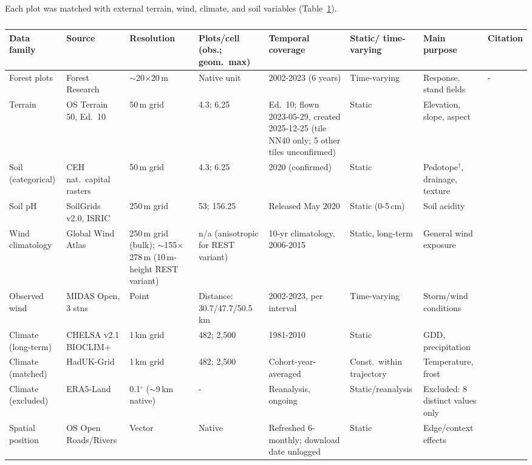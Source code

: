Each plot was matched with external terrain, wind, climate, and soil variables (Table~\ref{tab:data-env-sources}). 

\begin{table}[!htbp]
\tiny
\setlength{\tabcolsep}{2pt}
\renewcommand{\arraystretch}{0.9}
\begin{tabular}{p{1.6cm}p{2.1cm}p{1.6cm}p{1.5cm}p{2.3cm}p{1.6cm}p{2.3cm}p{0.7cm}}
\hline
Data family & Source & Resolution & Plots/cell (obs.; geom.\ max) & Temporal coverage & Static/ time-varying & Main purpose & Citation \\
\hline
Forest plots & Forest Research & $\sim$20$\times$20\,m & Native unit & 2002-2023 (6 years) & Time-varying & Response, stand fields & - \\
Terrain & OS Terrain 50, Ed.\ 10 & 50\,m grid & 4.3; 6.25 & Ed.\ 10; flown 2023-05-29, created 2025-12-25 (tile NN40 only; 5 other tiles unconfirmed) & Static & Elevation, slope, aspect & \cite{ordnancesurveyTerrain50_C3_LID} \\
Soil (categorical) & CEH nat.\ capital rasters & 50\,m grid & 4.3; 6.25 & 2020 (confirmed) & Static & Pedotope$^{\dagger}$, drainage, texture & \cite{feeney2026CEHNaturalCapital_C3_LID} \\
Soil pH & SoilGrids v2.0, ISRIC & 250\,m grid & 53; 156.25 & Released May 2020 & Static (0-5\,cm) & Soil acidity & \cite{poggio2021SoilGrids_C3_LID} \\
Wind climatology & Global Wind Atlas & 250\,m grid (bulk); $\sim$155$\times$278\,m (10\,m-height REST variant) & n/a (anisotropic for REST variant) & 10-yr climatology, 2006-2015 & Static, long-term & General wind exposure & \cite{davis2023GlobalWindAtlas_C3_LID} \\
Observed wind & MIDAS Open, 3 stns & Point & Distance: 30.7/47.7/50.5\,km & 2002-2023, per interval & Time-varying & Storm/wind conditions & \cite{metoffice2019MIDASOpen_C3_LID} \\
Climate (long-term) & CHELSA v2.1 BIOCLIM+ & 1\,km grid & 482; 2{,}500 & 1981-2010 & Static & GDD, precipitation & \cite{karger2017CHELSA_C3_LID} \\
Climate (matched) & HadUK-Grid & 1\,km grid & 482; 2{,}500 & Cohort-year-averaged & Const.\ within trajectory & Temperature, frost & \cite{hollis2019HadUKGrid_C3_LID} \\
Climate (excluded) & ERA5-Land & 0.1$^\circ$ ($\sim$9\,km native) & - & Reanalysis, ongoing & Static/reanalysis & Excluded: 8 distinct values only & \cite{munozsabater2021ERA5Land_C3_LID} \\
Spatial position & OS Open Roads/Rivers & Vector & Native & Refreshed 6-monthly; download date unlogged & Static & Edge/context effects & \cite{ordnancesurveyOpenRoads_C3_LID, ordnancesurveyOpenRivers_C3_LID} \\
\hline
\end{tabular}
\caption{ }
\label{tab:data-env-sources}
\end{table}

